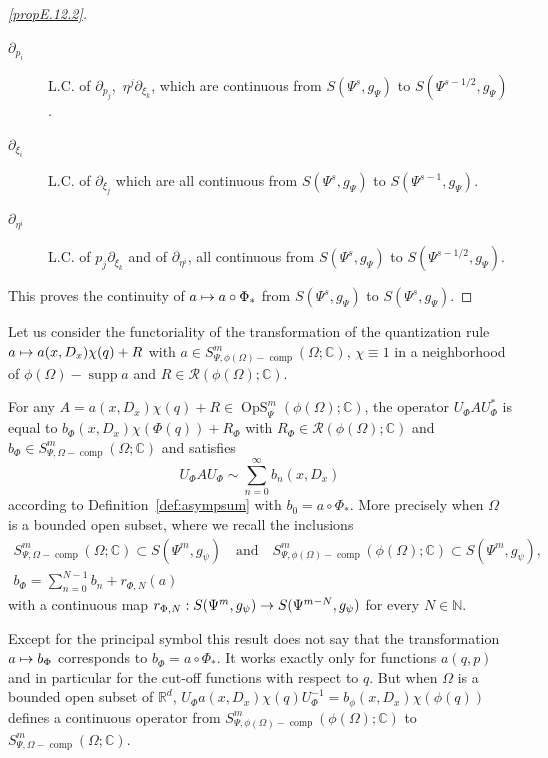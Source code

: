 \documentclass[AHL,Unicode,longabstracts]{cedram}
\newcommand{\C}{\mathbb{C}}
\newcommand{\R}{\mathbb{R}}
\newcommand{\N}{\mathbb{N}}
\newcommand{\clR}{\mathcal{R}}
\DeclareMathOperator{\OpS}{OpS}
\DeclareMathOperator{\ccomp}{comp}
\DeclareMathOperator{\suppp}{supp}
\renewcommand*{\to}{\mathchoice{\longrightarrow}{\rightarrow}{\rightarrow}{\rightarrow}}
\let\oldmapsto\mapsto
\renewcommand*{\mapsto}{\mathchoice{\longmapsto}{\oldmapsto}{\oldmapsto}{\oldmapsto}}
\begin{document}
\begin{proofc}
\begin{proof}[{\eqref{propE.12.2}}]
\begin{description}
\item[$\partial_{p_{i}}$] L.C. of $\partial_{p_{j}}$,\, $\eta^{j}\partial_{\xi_{k}}$, which are continuous from $S(\Psi^{s},g_{\Psi})$ to $S(\Psi^{s-1/2},g_{\Psi})$.
\item[$\partial_{\xi_{i}}$] L.C. of $\partial_{\xi_{j}}$ which are all continuous from $S(\Psi^{s},g_{\Psi})$ to $S(\Psi^{s-1},g_{\Psi})$.
\item[$\partial_{\eta^{i}}$] L.C. of $p_{j}\partial_{\xi_{k}}$ and of $\partial_{\eta^{i}}$, all continuous from $S(\Psi^{s},g_{\Psi})$ to $S(\Psi^{s-1/2},g_{\Psi})$.
\end{description} This proves the continuity of $a\mapsto a\circ \Phi_{*}$ from $S(\Psi^{s},g_{\Psi})$ to $S(\Psi^{s},g_{\Psi})$.
\end{proof}
\let\qed\relax
\end{proofc}

Let us consider the functoriality of the transformation of the quantization rule $a\mapsto a(x,D_{x})\chi(q)+R$ with $a\in S^{m}_{\Psi,\phi(\Omega)-\ccomp}(\Omega;\C)$, $\chi\equiv 1$ in a neighborhood of $\phi(\Omega)-\suppp a$ and $R\in \clR(\phi(\Omega);\C)$.

\pagebreak
\begin{prop}\label{pr:quantchang}
For any $A=a(x,D_{x})\chi(q)+R\in \OpS^{m}_{\Psi}(\phi(\Omega);\C)$, the operator $U_{\Phi}AU_{\Phi}^{*}$ is equal to $b_{\Phi}(x,D_{x})\chi(\Phi(q))+R_{\Phi}$ with $R_{\Phi}\in \clR(\phi(\Omega);\C)$ and $b_{\Phi}\in S^{m}_{\Psi,\Omega-\ccomp}(\Omega;\C)$ and satisfies
\[
U_{\Phi}AU_{\Phi}\sim \sum_{n=0}^{\infty} b_{n}(x,D_{x})
\]
according to Definition~\ref{def:asympsum} with $b_{0}=a\circ{\Phi}_{*}$. More precisely when $\Omega$ is a bounded open subset, where we recall the inclusions 
\begin{gather*}
S^{m}_{\Psi,\Omega-\ccomp}(\Omega;\C)\subset S(\Psi^{m},g_{\psi}) \quad\text{and}\quad S^{m}_{\Psi,\phi(\Omega)-\ccomp}(\phi(\Omega);\C)\subset S(\Psi^{m},g_{\psi}),\\
b_{\Phi}=\sum_{n=0}^{N-1}b_{n}+r_{\Phi,N}(a)
\end{gather*}
with a continuous map $r_{\Phi,N}:S(\Psi^{m},g_{\psi})\to S(\Psi^{m-N},g_{\psi})$ for every $N\in \N$.
\end{prop}
\begin{rema}
Except for the principal symbol this result does not say that the transformation $a\mapsto b_{\Phi}$ corresponds to $b_{\Phi}=a\circ \Phi_{*}$. It works exactly only for functions $a(q,p)$ and in particular for the cut-off functions with respect to $q$. But when $\Omega$ is a bounded open subset of $\R^{d}$, $U_{\Phi}a(x,D_{x})\chi(q)U_{\Phi}^{-1}=b_{\phi}(x,D_{x})\chi(\phi(q))$ defines a continuous operator from $S^{m}_{\Psi, \phi(\Omega)-\ccomp}(\phi(\Omega);\C)$ to $S^{m}_{\Psi, \Omega-\ccomp}(\Omega;\C)$.
\end{rema}
\end{document}
